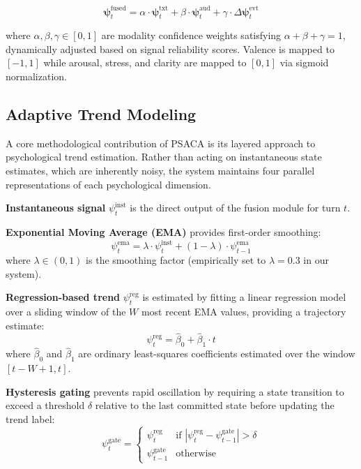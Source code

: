 \documentclass[conference]{IEEEtran}
\begin{document}
\begin{equation}
\boldsymbol{\psi}^{\text{fused}}_t = \alpha \cdot \boldsymbol{\psi}^{\text{txt}}_t + \beta \cdot \boldsymbol{\psi}^{\text{aud}}_t + \gamma \cdot \Delta\boldsymbol{\psi}^{\text{evt}}_t
\label{eq:fusion}
\end{equation}

where $\alpha, \beta, \gamma \in [0,1]$ are modality confidence weights satisfying $\alpha + \beta + \gamma = 1$, dynamically adjusted based on signal reliability scores. Valence is mapped to $[-1, 1]$ while arousal, stress, and clarity are mapped to $[0, 1]$ via sigmoid normalization.

\subsection{Adaptive Trend Modeling}

A core methodological contribution of PSACA is its layered approach to psychological trend estimation. Rather than acting on instantaneous state estimates, which are inherently noisy, the system maintains four parallel representations of each psychological dimension.

\textbf{Instantaneous signal} $\psi^{\text{inst}}_t$ is the direct output of the fusion module for turn $t$.

\textbf{Exponential Moving Average (EMA)} provides first-order smoothing:
\begin{equation}
\psi^{\text{ema}}_t = \lambda \cdot \psi^{\text{inst}}_t + (1 - \lambda) \cdot \psi^{\text{ema}}_{t-1}
\label{eq:ema}
\end{equation}
where $\lambda \in (0, 1)$ is the smoothing factor (empirically set to $\lambda = 0.3$ in our system).

\textbf{Regression-based trend} $\psi^{\text{reg}}_t$ is estimated by fitting a linear regression model over a sliding window of the $W$ most recent EMA values, providing a trajectory estimate:
\begin{equation}
\psi^{\text{reg}}_t = \hat{\beta}_0 + \hat{\beta}_1 \cdot t
\label{eq:regression}
\end{equation}
where $\hat{\beta}_0$ and $\hat{\beta}_1$ are ordinary least-squares coefficients estimated over the window $[t-W+1, t]$.

\textbf{Hysteresis gating} prevents rapid oscillation by requiring a state transition to exceed a threshold $\delta$ relative to the last committed state before updating the trend label:
\begin{equation}
\psi^{\text{gate}}_t = \begin{cases}
\psi^{\text{reg}}_t & \text{if } |\psi^{\text{reg}}_t - \psi^{\text{gate}}_{t-1}| > \delta \\
\psi^{\text{gate}}_{t-1} & \text{otherwise}
\end{cases}
\label{eq:hysteresis}
\end{equation}
\end{document}
